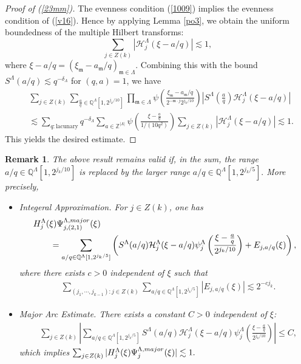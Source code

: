 \documentclass[10pt,a4paper]{amsart}
\newtheorem{remark}{Remark}\numberwithin{remark}{section}
\numberwithin{equation}{section}
\begin{document}
\begin{proof}[Proof of (\ref{23mm})]
The evenness condition (\ref{1009}) implies the evenness condition of (\ref{v16}).
Hence  by applying Lemma \ref{po3},  we obtain the uniform boundedness of the multiple Hilbert transforms:
 $$\sum_{j\in Z(k)}\left|\mathcal{H}^{\Lambda}_{j}\left( \xi-a/q\right)\right|\lesssim 1,$$
where $\xi-a/q=(\xi_{\mathfrak{m}}-a_{\mathfrak{m}}/q)_{\mathfrak{m}\in \Lambda}$.
Combining this with the bound $S^{\Lambda}(a/q)\lesssim q^{-\delta_{\Lambda}}$ for $(q,a)=1$, we   have
 \begin{align*}
 &  \sum_{ j\in Z(k)}\sum_{\frac{a}{q} \in  \mathbb{Q}^{\Lambda}[1,2^{j_k/10}]}\prod_{\mathfrak{m}\in \Lambda } \psi\left(  \frac{  \xi_{\mathfrak{m}}-a_{\mathfrak{m}}/q}{ 2^{-\mathfrak{m}\cdot j}2^{j_k/10}} \right)
 |S^{\Lambda}\left(\frac{a}{q}\right)\mathcal{H}^{\Lambda}_{j}\left(\xi-a/q\right)| \\
&\lesssim  \sum_{q:\text{lacunary}} q^{-\delta_{\Lambda}}\sum_{a\in \mathbb{Z}^{|\Lambda|}}\psi\left(\frac{\xi-\frac{a}{q}}{1/(10q^2)}\right)  
  \sum_{ j\in Z(k)}\left|\mathcal{H}^{\Lambda}_{j}\left(\xi-a/q\right)\right| \lesssim   1. \end{align*}
This yields the desired estimate.
\end{proof}





\begin{remark}\label{yt}
	The above result remains valid if, in the sum, the range
$a/q \in \mathbb{Q}^{\Lambda}[1,2^{j_k/10}]$
	is replaced by the larger range
$a/q \in \mathbb{Q}^{\Lambda}[1,2^{j_k/5}].$ More precisely,
\begin{itemize}
	\item[(1)]  Integeral Approximation.  For $j\in Z(k)$,
	one has
	\begin{align*}
		&H^{\Lambda}_j(\xi) \Psi^{\Lambda,\rm{major}}_{j,(2,1)}(\xi)\nonumber\\
		&\qquad=  \sum_{a/q\in \mathbb{Q}^{\Lambda}[1, 2^{j_k/5}]} \left(S^{\Lambda}(a/q) \mathcal{H}^{\Lambda}_j(\xi-a/q)  \psi_j^{\Lambda}\left( \frac{\xi-\frac{a}{q}}{2^{j_{k}/10}} \right)+E_{j,a/q}(\xi)\right), 
	\end{align*}
	where there exists $c>0$ independent of $\xi$ such that 
	\begin{align*}
		&\sum_{(j_1,\cdots,j_{k-1}):j\in Z(k)}\sum_{a/q\in \mathbb{Q}^{\Lambda}[1, 2^{j_k/5}]}|E_{j,a/q}(\xi)|\lesssim 2^{-cj_k}.
	\end{align*}
	\item[(2)]  Major Arc Estimate.
	There exists a constant $C >0$ independent of $\xi$:
	\begin{align*}
		&\sum_{j\in Z(k) }\left|   \sum_{a/q\in \mathbb{Q}^{\Lambda}[1,2^{j_k/5}]}S^{\Lambda}(a/q)\mathcal{H}_j^{\Lambda}(\xi-a/q) \psi_j^{\Lambda}\left( \frac{\xi-\frac{a}{q}}{2^{j_{k}/10}} \right) \right|
		\le C,
	\end{align*}
	which  implies 
	$
	\sum_{j\in Z(k)} |H^{\Lambda}_j(\xi) \Psi^{\Lambda,\rm{major}}_{j}(\xi)|\lesssim 1.
	$
\end{itemize}
\end{remark}
\end{document}
